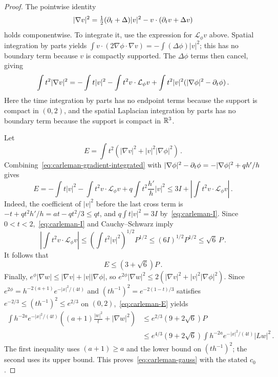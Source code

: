 \documentclass[11pt,letterpaper]{article}
\numberwithin{equation}{section}
\theoremstyle{plain}
\theoremstyle{definition}
\theoremstyle{remark}
\begin{document}
\begin{proof}
The pointwise identity
\begin{equation}\label{eq:carleman-gradient-pointwise}
 |\nabla v|^2=\tfrac12(\partial_t+\Delta)|v|^2-v\cdot(\partial_t v+\Delta v)
\end{equation}
holds componentwise. To integrate it, use the expression for $\mathcal L_\phi v$ above. Spatial integration by parts yields
$\int v\cdot(2\nabla\phi\cdot\nabla v)=-\int(\Delta\phi)|v|^2$; this has no boundary term because $v$ is compactly supported. The $\Delta\phi$ terms then cancel, giving
\begin{equation}\label{eq:carleman-gradient-integrated}
 \int t^2|\nabla v|^2
 =-\int t|v|^2-\int t^2v\cdot\mathcal L_\phi v
   +\int t^2|v|^2( |\nabla\phi|^2-\partial_t\phi)\,.
\end{equation}
Here the time integration by parts has no endpoint terms because the support is compact in $(0,2)$, and the spatial Laplacian integration by parts has no boundary term because the support is compact in $\mathbb{R}^3$.

Let
\[
 E=\int t^2\left(|\nabla v|^2+|v|^2|\nabla\phi|^2\right)\,.
\]
Combining~\eqref{eq:carleman-gradient-integrated} with
$|\nabla\phi|^2-\partial_t\phi=-|\nabla\phi|^2+q h'/h$ gives
\[
 E=-\int t|v|^2-\int t^2v\cdot\mathcal L_\phi v
       +q\int t^2\frac{h'}h|v|^2
 \le 3I+\left|\int t^2v\cdot\mathcal L_\phi v\right|\,.
\]
Indeed, the coefficient of $|v|^2$ before the last cross term is
$-t+qt^2h'/h=at-qt^2/3\le qt$, and $q\int t|v|^2=3I$ by~\eqref{eq:carleman-I}. Since $0<t<2$,~\eqref{eq:carleman-I} and Cauchy--Schwarz imply
\[
 \left|\int t^2v\cdot\mathcal L_\phi v\right|
 \le \left(\int t^2|v|^2\right)^{1/2}P^{1/2}
 \le (6I)^{1/2}P^{1/2}\le\sqrt6\,P\,.
\]
It follows that
\begin{equation}\label{eq:carleman-E}
 E\le(3+\sqrt6)P\,.
\end{equation}
Finally, $e^\phi|\nabla w|\le|\nabla v|+|v||\nabla\phi|$, so
$e^{2\phi}|\nabla w|^2\le2(|\nabla v|^2+|v|^2|\nabla\phi|^2)$. Since
$e^{2\phi}=h^{-2(a+1)}e^{-|x|^2/(4t)}$ and
$(th^{-1})^2=e^{-2(1-t)/3}$ satisfies $e^{-2/3}\le(th^{-1})^2\le e^{2/3}$ on $(0,2)$,~\eqref{eq:carleman-E} yields
\begin{align*}
 \int h^{-2a}e^{-|x|^2/(4t)}
       \left((a+1)\frac{|w|^2}{t}+|\nabla w|^2\right)
 &\le e^{2/3}(9+2\sqrt6)P\\
 &\le e^{4/3}(9+2\sqrt6)
       \int h^{-2a}e^{-|x|^2/(4t)}|Lw|^2\,.
\end{align*}
The first inequality uses $(a+1)\ge a$ and the lower bound on $(th^{-1})^2$; the second uses its upper bound. This proves~\eqref{eq:carleman-gauss} with the stated $c_0$.
\end{proof}
\end{document}
